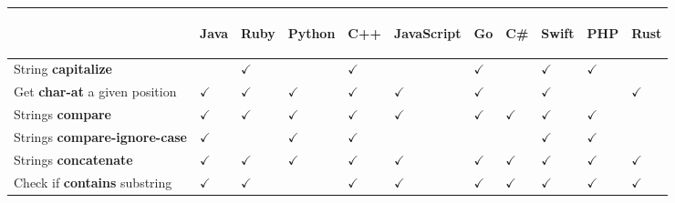 \documentclass[anonymous,sigplan,review,11pt,nonacm,natbib=false]{acmart}
\begin{document}
    \begin{table*}
        \begin{tabular}{lllllllllll}
            \hline
            & \begin{sideways}Java\end{sideways}
            & \begin{sideways}Ruby\end{sideways}
            & \begin{sideways}Python\end{sideways}
            & \begin{sideways}C++\end{sideways}
            & \begin{sideways}JavaScript\end{sideways}
            & \begin{sideways}Go\end{sideways}
            & \begin{sideways}C\#\end{sideways}
            & \begin{sideways}Swift\end{sideways}
            & \begin{sideways}PHP\end{sideways}
            & \begin{sideways}Rust\end{sideways}
            \\ \hline
            String \textbf{capitalize} & & $\checkmark$ & & $\checkmark$ & & $\checkmark$ & & $\checkmark$ & $\checkmark$ & \\
            Get \textbf{char-at} a given position & $\checkmark$ & $\checkmark$ & $\checkmark$ & $\checkmark$ & $\checkmark$ & $\checkmark$ & & $\checkmark$ & & $\checkmark$ \\
            Strings \textbf{compare} & $\checkmark$ & $\checkmark$ & $\checkmark$ & $\checkmark$ & $\checkmark$ & $\checkmark$ & $\checkmark$ & $\checkmark$ & $\checkmark$ & \\
            Strings \textbf{compare-ignore-case} & $\checkmark$ & & $\checkmark$ & $\checkmark$ & & & & $\checkmark$ & $\checkmark$ & \\
            Strings \textbf{concatenate} & $\checkmark$ & $\checkmark$ & $\checkmark$ & $\checkmark$ & $\checkmark$ & $\checkmark$ & $\checkmark$ & $\checkmark$ & $\checkmark$ & $\checkmark$ \\
            Check if \textbf{contains} substring & $\checkmark$ & $\checkmark$ & & $\checkmark$ & $\checkmark$ & $\checkmark$ & $\checkmark$ & $\checkmark$ & $\checkmark$ & $\checkmark$ \\

\end{tabular}
\end{table*}
\end{document}
